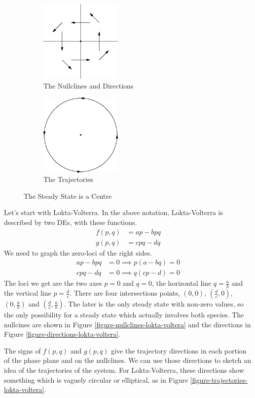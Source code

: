 \documentclass[fleqn,letterpaper]{report}
\begin{document}
\begin{figure}[h!]
\centering
\begin{subfigure}{.5\textwidth}
\centering
\includegraphics[width=4cm]{figure29.eps}
\caption{The Nullclines and Directions}
\end{subfigure}%
\begin{subfigure}{.5\textwidth}
\centering
\includegraphics[width=4cm]{figure50.eps}
\caption{The Trajectories}
\end{subfigure}
\caption{The Steady State is a Centre}
\label{figure-centre}
\end{figure}

\begin{example}
Let's start with Lokta-Volterra. In the above
notation, Lokta-Volterra is described by two DEs, with these
functions.
\begin{align*}
f(p,q) & = ap - bpq \\
g(p,q) & = cpq - dq 
\end{align*}
We need to graph the zero-loci of the right sides.
\begin{align*}
ap - bpq & = 0 \implies p ( a - bq) = 0\\
cpq - dq & = 0 \implies q (cp - d) = 0
\end{align*}
The loci we get are the two axes $p=0$ and $q=0$, the
horizontal line $q = \frac{a}{b}$ and the vertical line $p =
\frac{d}{c}$. There are four intersections points, $(0,0)$,
$\left(\frac{d}{c},0\right)$, $\left(0,\frac{a}{b} \right)$
and $\left( \frac{d}{c}, \frac{a}{b} \right)$. The later is
the only steady state with non-zero values, so the only
possibility for a steady state which actually involves both
species. The nullcines are shown in Figure
\ref{figure-nullclines-lokta-voltera} and the directions in Figure
\ref{figure-directions-lokta-voltera}. 

The signs of $f(p,q)$ and $g(p,q)$ give the trajectory
directions in each portion of the phase plane and on the
nullclines. We can use those directions to sketch an idea of
the trajectories of the system. For Lokta-Volterra, these
directions show something which is vaguely circular or
elliptical, as in Figure \ref{figure-trajectories-lokta-voltera}.
\end{example}
\end{document}
